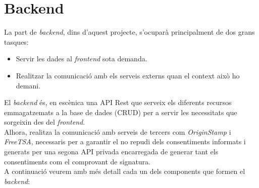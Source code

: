 \section{Backend}
\label{backend}
La part de \textit{backend}, dins d'aquest projecte, s'ocuparà principalment de dos grans tasques:
\begin{itemize}
    \item Servir les dades al \textit{frontend} sota demanda.
    \item Realitzar la comunicació amb els serveis externs quan el context això ho demani.
\end{itemize}

El \textit{backend} és, en escènica una API Rest que serveix els diferents recursos emmagatzemats a la base de dades (CRUD) per a servir les necessitats que sorgeixin des del \textit{frontend}.\\
Alhora, realitza la comunicació amb serveis de tercers com \textit{OriginStamp} i \textit{FreeTSA}, necessaris per a garantir el no repudi dels consentiments informats i generats per una segona API privada encarregada de generar tant els consentiments com el comprovant de signatura.\\
\newline A continuació veurem amb més detall cada un dels components que formen el \textit{backend}:


